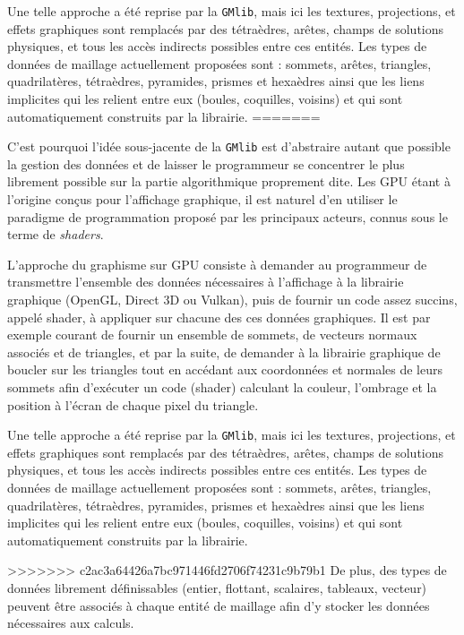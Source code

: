 \documentclass[a4paper,12pt]{article}
\begin{document}
Une telle approche a été reprise par la {\tt GMlib}, mais ici les textures, projections, et effets graphiques sont remplacés par des tétraèdres, arêtes, champs de solutions physiques, et tous les accès indirects possibles entre ces entités.
Les types de données de maillage actuellement proposées sont : sommets, arêtes, triangles, quadrilatères, tétraèdres, pyramides, prismes et hexaèdres ainsi que les liens implicites qui les relient entre eux (boules, coquilles, voisins) et qui sont automatiquement construits par la librairie.
=======

C'est pourquoi l'idée sous-jacente de la {\tt GMlib} est d'abstraire autant que possible la gestion des données et de laisser le programmeur se concentrer le plus librement possible sur la partie algorithmique proprement dite.
Les GPU étant à l'origine conçus pour l'affichage graphique, il est naturel d'en utiliser le paradigme de programmation proposé par les principaux acteurs, connus sous le terme de \emph{shaders}.

L'approche du graphisme sur GPU consiste à demander au programmeur de transmettre l'ensemble des données nécessaires à l'affichage à la librairie graphique (OpenGL, Direct 3D ou Vulkan), puis de fournir un code assez succins, appelé shader, à appliquer sur chacune des ces données graphiques.
Il est par exemple courant de fournir un ensemble de sommets, de vecteurs normaux associés et de triangles, et par la suite, de demander à la librairie graphique de boucler sur les triangles tout en accédant aux coordonnées et normales de leurs sommets afin d'exécuter un code (shader) calculant la couleur, l'ombrage et la position à l'écran de chaque pixel du triangle.

Une telle approche a été reprise par la {\tt GMlib}, mais ici les textures, projections, et effets graphiques sont remplacés par des tétraèdres, arêtes, champs de solutions physiques, et tous les accès indirects possibles entre ces entités.
Les types de données de maillage actuellement proposées sont : sommets, arêtes, triangles, quadrilatères, tétraèdres, pyramides, prismes et hexaèdres ainsi que les liens implicites qui les relient entre eux (boules, coquilles, voisins) et qui sont automatiquement construits par la librairie.

>>>>>>> c2ac3a64426a7bc971446fd2706f74231c9b79b1
De plus, des types de données librement définissables (entier, flottant, scalaires, tableaux, vecteur) peuvent être associés à chaque entité de maillage afin d'y stocker les données nécessaires aux calculs.
\end{document}
